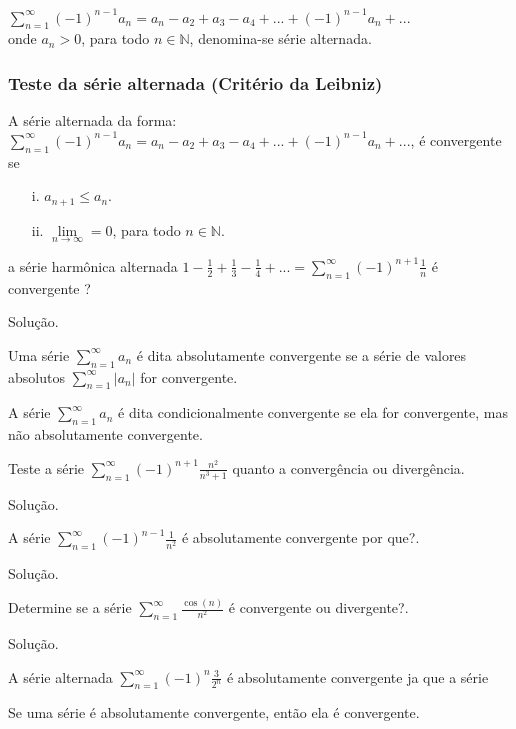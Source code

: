 $\sum_{n=1}^{\infty}(-1)^{n-1}a_{n}=a_{n}-a_{2}+a_{3}-a_{4}+...+(-1)^{n-1}a_{n}+...$\\
onde $a_{n}>0$, para todo $n\in \mathbb{N}$, denomina-se série alternada.
\subsubsection{Teste da série alternada (Critério da Leibniz)} 

A série alternada da forma: \\

$\sum_{n=1}^{\infty}(-1)^{n-1}a_{n}=a_{n}-a_{2}+a_{3}-a_{4}+...+(-1)^{n-1}a_{n}+...$, é convergente se 
\begin{itemize}
	\item[i.] $a_{n+1}\leq a_{n}$.
	\item[ii.] $\lim\limits_{n\rightarrow\infty}=0$, para todo $n\in\mathbb{N}$.
\end{itemize} 
\begin{ex}
	a série harmônica alternada $1-\frac{1}{2}+\frac{1}{3}-\frac{1}{4}+...=\sum_{n=1}^{\infty}(-1)^{n+1}\frac{1}{n}$ é convergente ?
	
	Solução.
\end{ex}
\vspace*{5cm}
\begin{df}
	Uma série $\sum_{n=1}^{\infty}a_{n}$ é dita absolutamente convergente se a série de valores absolutos $\sum_{n=1}^{\infty}|a_{n}|$ for convergente.
\end{df}
\begin{df}
	A série $\sum_{n=1}^{\infty}a_{n}$ é dita condicionalmente convergente se ela for convergente, mas não absolutamente convergente.
\end{df}
\begin{ex}
	Teste a série $\sum_{n=1}^{\infty}(-1)^{n+1}\frac{n^{2}}{n^{3}+1}$ quanto a convergência ou divergência.
	
	Solução.
\end{ex}
\vspace*{5cm}
\begin{ex}
	A série $\sum_{n=1}^{\infty}(-1)^{n-1}\frac{1}{n^{2}}$ é absolutamente convergente por que?.
	
	Solução.
\end{ex}

\vspace*{5cm}
\begin{ex}
Determine se a série $\sum_{n=1}^{\infty}\frac{\cos (n)}{n^{2}}$ é convergente ou divergente?.
	
	Solução.
\end{ex}
\vspace*{5cm}
\begin{ex}
	A série alternada $\sum_{n=1}^{\infty}(-1)^{n}\frac{3}{2^{n}}$ é absolutamente convergente ja que a série
\end{ex}
\vspace*{5cm}
\begin{teo} 
	Se uma série é absolutamente convergente, então ela é convergente.
\end{teo}
